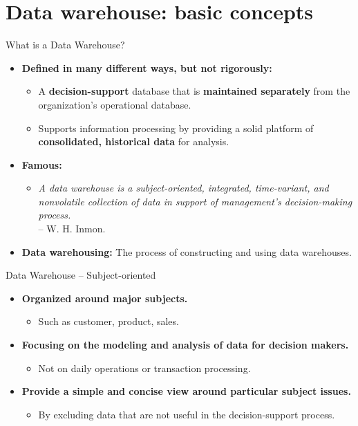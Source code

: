 \section{Data warehouse: basic concepts}

\begin{frame}{What is a Data Warehouse?}
  \begin{itemize}
  \item \textbf{Defined in many different ways, but not rigorously:}
    \begin{itemize}
    \item A \textbf{\color{airforceblue}decision-support} database that is \textbf{\color{airforceblue}maintained separately} from the organization's operational database.
    \item Supports information processing by providing a solid platform of \textbf{\color{airforceblue}consolidated, historical data} for analysis.
    \end{itemize}
  \item \textbf{Famous:} \\
    \begin{itemize}
    \item \emph{A data warehouse is a {\color{airforceblue}subject-oriented, integrated, time-variant, and nonvolatile} collection of data in support of management's decision-making process.}\\-- W. H. Inmon.
    \end{itemize}
  \item \textbf{\color{airforceblue}Data warehousing:} The process of constructing and using data warehouses.
  \end{itemize}
\end{frame}

\begin{frame}{Data Warehouse -- Subject-oriented}
  \begin{itemize}
  \item \textbf{Organized around major subjects.}
    \begin{itemize}
    \item Such as customer, product, sales.
    \end{itemize}
  \item \textbf{Focusing on the modeling and analysis of data for {\color{airforceblue}decision makers}.}
    \begin{itemize}
    \item Not on daily operations or transaction processing.
    \end{itemize}
  \item \textbf{Provide a simple and concise view around particular subject issues.}
    \begin{itemize}
    \item By excluding data that are not useful in the decision-support process.
    \end{itemize}
  \end{itemize}
\end{frame}

